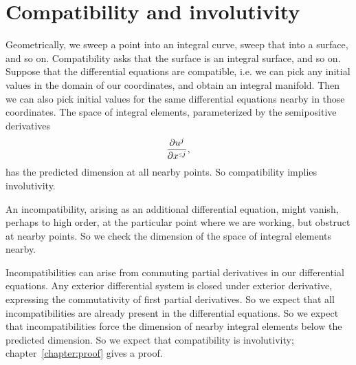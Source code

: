 
\section{Compatibility and involutivity}
Geometrically, we sweep a point into an integral curve, sweep that into a surface, and so on.
Compatibility asks that the surface is an integral surface, and so on.
Suppose that the differential equations are compatible, i.e. we can pick any initial values in the domain of our coordinates, and obtain an integral manifold.
Then we can also pick initial values for the same differential equations nearby in those coordinates.
The space of integral elements, parameterized by the semipositive derivatives
\[
\pderiv{u^j}{x^{\legr{j}}},
\] 
has the predicted dimension at all nearby points.
So compatibility implies involutivity.

An incompatibility, arising as an additional differential equation, might vanish, perhaps to high order, at the particular point where we are working, but obstruct at nearby points. 
So we check the dimension of the space of integral elements nearby.

Incompatibilities can arise from commuting partial derivatives in our differential equations.
Any exterior differential system is closed under exterior derivative, expressing the commutativity of first partial derivatives.
So we expect that all incompatibilities are already present in the differential equations.
So we expect that incompatibilities force the dimension of nearby integral elements below the predicted dimension.
So we expect that compatibility is involutivity; chapter~\ref{chapter:proof} gives a proof.

